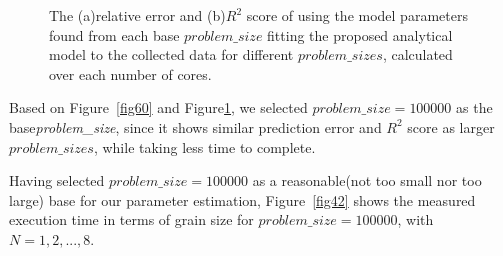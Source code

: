 \vspace{\baselineskip}
\begin{figure}[H]
	\centering
	\label{fig61:a}
	\label{fig61:b}
	\caption{The (a)relative error and (b)$R^2$ score of using the model parameters found from each base $problem\_{size}$ fitting the proposed analytical model to the collected data for different $problem\_{sizes}$, calculated over each number of cores.}\label{fig61}		
\end{figure}

Based on Figure~\ref{fig60} and Figure\ref{fig61}, we selected $problem\_{size}=100000$ as the base\emph{problem\_{size}}, since it shows similar prediction error and $R^2$ score as larger $problem\_{size}s$, while taking less time to complete.

Having selected $problem\_{size}=100000$ as a reasonable(not too small nor too large) base for our parameter estimation, Figure~\ref{fig42} shows the measured execution time in terms of grain size for $problem\_{size}=100000$, with $N=1,2,...,8$.
 
